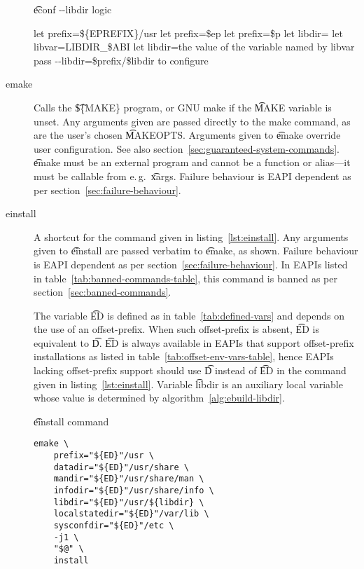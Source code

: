\begin{description}
\begin{algorithm}
\caption{\t{econf -{}-libdir} logic} \label{alg:econf-libdir}
\begin{algorithmic}[1]
\STATE let prefix=\$\{EPREFIX\}/usr
    \STATE let prefix=\$ep
    \STATE let prefix=\$p
\ENDIF
\STATE let libdir=
    \STATE let libvar=LIBDIR_\$ABI
        \STATE let libdir=the value of the variable named by libvar
    \ENDIF
\ENDIF
{}
    \STATE pass -{}-libdir=\$prefix/\$libdir to configure
\ENDIF
\end{algorithmic}
\end{algorithm}

\item[emake] Calls the \t{\$\{MAKE\}} program, or GNU make if the \t{MAKE} variable is unset.
    Any arguments given are passed directly to the make command, as are the user's chosen
    \t{MAKEOPTS}\@. Arguments given to \t{emake} override user configuration. See also
    section~\ref{sec:guaranteed-system-commands}. \t{emake} must be an external program and cannot
    be a function or alias---it must be callable from e.\,g.\ \t{xargs}. Failure behaviour is EAPI
    dependent as per section~\ref{sec:failure-behaviour}.

\item[einstall] A shortcut for the command given in listing~\ref{lst:einstall}. Any arguments given
    to \t{einstall} are passed verbatim to \t{emake}, as shown. Failure behaviour is EAPI dependent
    as per section~\ref{sec:failure-behaviour}.
    In EAPIs listed in table~\ref{tab:banned-commands-table}, this command is banned as per
    section~\ref{sec:banned-commands}.

    The variable \t{ED} is defined as in table~\ref{tab:defined-vars} and depends on the use of an
    offset-prefix. When such offset-prefix is absent, \t{ED} is equivalent to \t{D}\@. \t{ED} is
    always available in EAPIs that support offset-prefix installations as listed in
    table~\ref{tab:offset-env-vars-table}, hence EAPIs lacking offset-prefix support should use
    \t{D} instead of \t{ED} in the command given in listing~\ref{lst:einstall}.
    Variable \t{libdir} is an auxiliary local variable whose value is determined by
    algorithm~\ref{alg:ebuild-libdir}.

\begin{listing}[H]
\caption{\t{einstall} command} \label{lst:einstall}
\begin{verbatim}
emake \
    prefix="${ED}"/usr \
    datadir="${ED}"/usr/share \
    mandir="${ED}"/usr/share/man \
    infodir="${ED}"/usr/share/info \
    libdir="${ED}"/usr/${libdir} \
    localstatedir="${ED}"/var/lib \
    sysconfdir="${ED}"/etc \
    -j1 \
    "$@" \
    install
\end{verbatim}
\end{listing}

\end{description}

